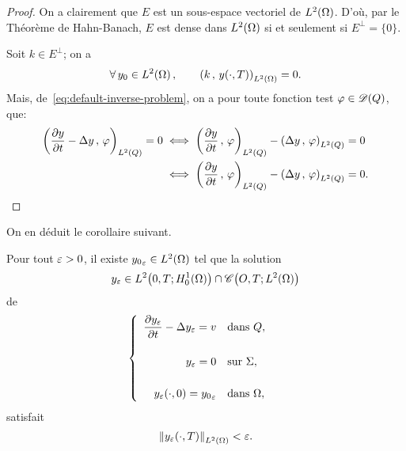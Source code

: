 \begin{proof}%
    On a clairement que $E$ est un sous-espace vectoriel de
    $L^{2}\!\left({\Omega}\right)$. D'où, par le Théorème de Hahn-Banach, $E$ est dense
    dans $L^{2}\!\left({\Omega}\right)$ si et seulement si $E^{\perp} = \{0\}$.

    Soit $k\in E^{\perp}$; on a
    \begin{equation}\label{eq:proof-controllability-26}
        \forall\,y_{0}\in L^{2}\!\left({\Omega}\right),\qquad {\left({ k\,,\,y(\cdot,T) }\right)}_{L^{2}\left({\Omega}\right)}
        = 0.
    \end{equation}
    Mais, de~\eqref{eq:default-inverse-problem}, on a pour toute fonction
    test $\varphi\in\mathscr{D}(Q)$, que:
    \begin{equation*}
        \begin{split}
            {\left({  \dfrac{\partial{}y}{\partial{}t}  - \Delta y\,,\,\varphi}\right)}_{L^{2}\left({Q}\right)} = 0 &\iff
            {\left({  \dfrac{\partial{}y}{\partial{}t} \,,\,\varphi}\right)}_{L^{2}\left({Q}\right)} - {\left({ \Delta y\,,\,\varphi }\right)}_{L^{2}\left({Q}\right)}
            = 0\\
            &\iff {\left({  \dfrac{\partial{}y}{\partial{}t} \,,\,\varphi}\right)}_{L^{2}\left({Q}\right)} - {\left({ \Delta
            y\,,\,\varphi }\right)}_{L^{2}\left({Q}\right)} = 0.
        \end{split}
    \end{equation*}
\end{proof}

On en déduit le corollaire suivant.

\begin{corollaire}\label{coro:controllability-result-2}%
    Pour tout $\varepsilon > 0$, il existe ${y_{0}}_{\varepsilon}\in L^{2}\!\left({\Omega}\right)$ tel
    que la solution
    \begin{equation}\label{eq:controllability-result-2}
        y_{\varepsilon}\in L^{2}\!\left({0,T;H_{0}^{1}(\Omega)}\right)\cap
        \mathscr{C}\!\left({O,T;L^{2}\!\left({\Omega}\right)}\right)
    \end{equation}
    de
    \begin{equation}\label{eq:controllability-result-3}
        \begin{cases}\displaystyle
            \begin{array}{rl}
                \dfrac{\partial{}y_{\varepsilon}}{\partial{}t} - \Delta y_{\varepsilon} = v &
                \text{dans}\ Q,\\
                \\
                y_{\varepsilon} = 0 & \text{sur}\ \Sigma,\\
                \\
                y_{\varepsilon}\!\left({\cdot,0}\right) = {y_{0}}_{\varepsilon} &
                \text{dans}\ \Omega,
            \end{array}
        \end{cases}
    \end{equation}
    satisfait
    \begin{equation}\label{eq:controllability-result-4}
        {\left\|{y_{\varepsilon}\!\left({\cdot,T}\right) }\right\|}_{L^{2}\left({\Omega}\right)} < \varepsilon.
    \end{equation}
\end{corollaire}

